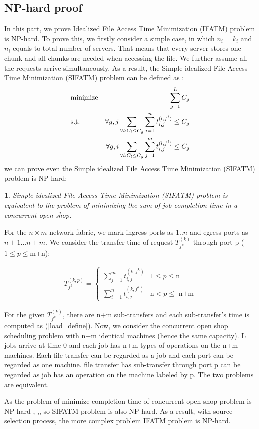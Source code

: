 \documentclass{IEEEtran}
\newtheorem{proposition}{\noindent{\bf proposition}}
\begin{document}
\subsection{NP-hard proof}
In this part, we prove  Idealized File Access Time Minimization (IFATM) problem is NP-hard.
To prove this, we firstly consider a simple case, in which $n_i=k_i$ and $n_i$ equals to total number of servers.
That means that every server stores one chunk and all chunks are needed when accessing the file.
We further assume all the requests arrive simultaneously.
As a result, the Simple idealized File Access Time Minimization (SIFATM) problem can be defined as
:
 \begin{eqnarray}
&\d {\rm minimize} & \sum_{g=1}^{L} C_{g} \label{eq:simple_ECSF-SC} \\
& \d{\rm s.t.} &\forall g,j\sum_{\forall l:C_l \leq C_g}\sum_{i=1}^{n}t_{i,j}^{(l,f^l)}\leq C_g  \label{eq:simple_ingress_constraint}\\
&&\forall g,i\sum_{\forall l:C_l \leq C_g}\sum_{j=1}^{m}t_{i,j}^{(l,f^l)} \leq C_g   \label{eq:simple_egress_constraint}
\end{eqnarray}
we can prove even the Simple idealized File Access Time Minimization (SIFATM) problem is NP-hard:


\begin{proposition} \label{WCCO-eq}
Simple idealized File Access Time Minimization (SIFATM) problem is equivalent to the problem of minimizing the sum of  job completion time in a concurrent open shop.
\end{proposition}

\begin{IEEEproof}
For the $n \times m$ network fabric, we mark ingress ports as $1..n$ and egress ports as $n+1...n+m$.
We consider the transfer time of request $T^{(k)}_{f^k} $ through port p ($1\leq p \leq $m+n):


\begin{eqnarray} \label{load_define}
T^{(k,p)}_{f^k}=\left\{ \begin{array}{ll}
\sum_{j=1}^mt_{i,j}^{(k,f^k)}& \textrm{$1\leq p \leq $n}\\
\sum_{i=1}^nt_{i,j}^{(k,f^k)}& \textrm{n$<p\leq$ n+m}
\end{array} \right.
\end{eqnarray}


For the given $T^{(k)}_{f^k} $, there are n+m sub-transfers and each sub-transfer's time is computed as (\ref{load_define}).
Now, we consider the concurrent open shop scheduling problem with n+m identical machines (hence the same capacity). 
L jobs arrive at time 0 and each job has n+m types of operations on the n+m machines. 
Each file transfer can be regarded as a job and each port can be regarded as one machine.
file transfer has sub-transfer through port p can be regarded as job has an operation on the machine labeled by p.
The two problems are equivalent.
\end{IEEEproof}
As the problem of minimize completion time of concurrent open shop problem is NP-hard \cite{mastrolilli2010minimizing},
\cite{chen2000supply},\cite{roemer2006note}, so SIFATM problem is also NP-hard.
As a result, with source selection process, the more complex problem IFATM problem is NP-hard.
\end{document}
